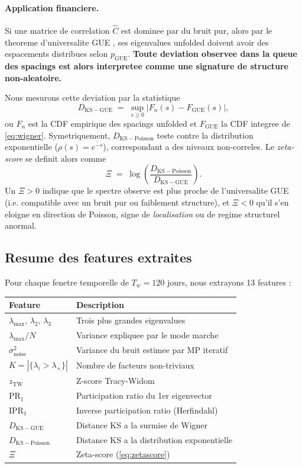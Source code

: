 \documentclass[11pt,a4paper]{article}
\begin{document}
\paragraph{Application financiere.}
Si une matrice de correlation $\widehat{C}$ est dominee par du bruit pur, alors par le theoreme d'universalite GUE \citep{Erdos2012}, ses eigenvalues unfolded doivent avoir des espacements distribues selon $p_{\mathrm{GUE}}$. \textbf{Toute deviation observee dans la queue des spacings est alors interpretee comme une signature de structure non-aleatoire.}

Nous mesurons cette deviation par la statistique
\begin{equation}
D_{\mathrm{KS-GUE}} \;=\; \sup_{s \ge 0} \left| F_n(s) - F_{\mathrm{GUE}}(s) \right|,
\label{eq:KS}
\end{equation}
ou $F_n$ est la CDF empirique des spacings unfolded et $F_{\mathrm{GUE}}$ la CDF integree de \cref{eq:wigner}. Symetriquement, $D_{\mathrm{KS-Poisson}}$ teste contre la distribution exponentielle ($\rho(s) = e^{-s}$), correspondant a des niveaux non-correles. Le \emph{zeta-score} se definit alors comme
\begin{equation}
\Xi \;=\; \log\!\left(\frac{D_{\mathrm{KS-Poisson}}}{D_{\mathrm{KS-GUE}}}\right).
\label{eq:zetascore}
\end{equation}
Un $\Xi > 0$ indique que le spectre observe est plus proche de l'universalite GUE (i.e. compatible avec un bruit pur ou faiblement structure), et $\Xi < 0$ qu'il s'en eloigne en direction de Poisson, signe de \emph{localisation} ou de regime structurel anormal.

\subsection{Resume des features extraites}

Pour chaque fenetre temporelle de $T_w = 120$ jours, nous extrayons 13 features :
\medskip

\noindent
\begin{tabular}{p{4.0cm} p{10cm}}
\toprule
\textbf{Feature} & \textbf{Description} \\
\midrule
$\lambda_{\max},\, \lambda_2,\, \lambda_3$ & Trois plus grandes eigenvalues \\
$\lambda_{\max}/N$ & Variance expliquee par le mode marche \\
$\sigma^2_{\mathrm{noise}}$ & Variance du bruit estimee par MP iteratif \\
$K = |\{\lambda_i > \lambda_+\}|$ & Nombre de facteurs non-triviaux \\
$z_{\mathrm{TW}}$ & Z-score Tracy-Widom \\
$\mathrm{PR}_1$ & Participation ratio du 1er eigenvector \\
$\mathrm{IPR}_1$ & Inverse participation ratio (Herfindahl) \\
$D_{\mathrm{KS-GUE}}$ & Distance KS a la surmise de Wigner \\
$D_{\mathrm{KS-Poisson}}$ & Distance KS a la distribution exponentielle \\
$\Xi$ & Zeta-score (\cref{eq:zetascore}) \\
\bottomrule
\end{tabular}
\medskip
\end{document}

